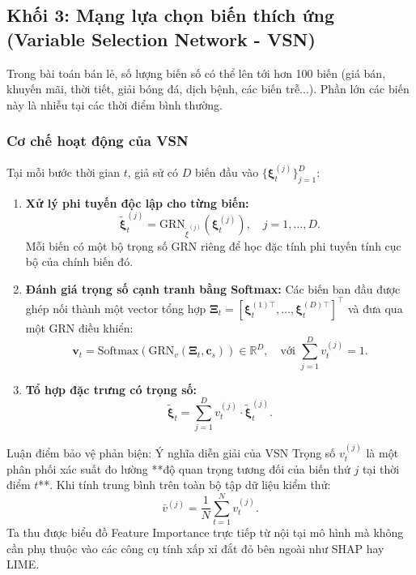\documentclass[12pt,a4paper,oneside]{article}
\begin{document}
\subsection{Khối 3: Mạng lựa chọn biến thích ứng (Variable Selection Network - VSN)}
\label{subsec:vsn}

Trong bài toán bán lẻ, số lượng biến số có thể lên tới hơn 100 biến (giá bán, khuyến mãi, thời tiết, giải bóng đá, dịch bệnh, các biến trễ...). Phần lớn các biến này là nhiễu tại các thời điểm bình thường.

\subsubsection{Cơ chế hoạt động của VSN}
Tại mỗi bước thời gian $t$, giả sử có $D$ biến đầu vào $\{\bm{\xi}_t^{(j)}\}_{j=1}^D$:
\begin{enumerate}
    \item \textbf{Xử lý phi tuyến độc lập cho từng biến:}
    \begin{equation}
        \tilde{\bm{\xi}}_t^{(j)} = \text{GRN}_{\tilde{\xi}^{(j)}}\!\left(\bm{\xi}_t^{(j)}\right), \quad j = 1, \dots, D.
        \label{eq:vsn_indiv}
    \end{equation}
    Mỗi biến có một bộ trọng số GRN riêng để học đặc tính phi tuyến tính cục bộ của chính biến đó.

    \item \textbf{Đánh giá trọng số cạnh tranh bằng Softmax:}
    Các biến ban đầu được ghép nối thành một vector tổng hợp $\bm{\Xi}_t = [\bm{\xi}_t^{(1)\top}, \dots, \bm{\xi}_t^{(D)\top}]^\top$ và đưa qua một GRN điều khiển:
    \begin{equation}
        \mathbf{v}_t = \text{Softmax}\!\left(\text{GRN}_v(\bm{\Xi}_t, \mathbf{c}_s)\right) \in \mathbb{R}^D, \quad \text{với } \sum_{j=1}^D v_t^{(j)} = 1.
        \label{eq:vsn_weights}
    \end{equation}

    \item \textbf{Tổ hợp đặc trưng có trọng số:}
    \begin{equation}
        \tilde{\bm{\xi}}_t = \sum_{j=1}^D v_t^{(j)} \cdot \tilde{\bm{\xi}}_t^{(j)}.
        \label{eq:vsn_aggregated}
    \end{equation}
\end{enumerate}

\begin{defensebox}{Luận điểm bảo vệ phản biện: Ý nghĩa diễn giải của VSN}
    Trọng số $v_t^{(j)}$ là một phân phối xác suất đo lường **độ quan trọng tương đối của biến thứ $j$ tại thời điểm $t$**. Khi tính trung bình trên toàn bộ tập dữ liệu kiểm thử:
    \begin{equation}
        \bar{v}^{(j)} = \frac{1}{N} \sum_{t=1}^N v_t^{(j)}.
        \label{eq:avg_vsn}
    \end{equation}
    Ta thu được biểu đồ Feature Importance trực tiếp từ nội tại mô hình mà không cần phụ thuộc vào các công cụ tính xấp xỉ đắt đỏ bên ngoài như SHAP hay LIME.
\end{defensebox}
\end{document}
